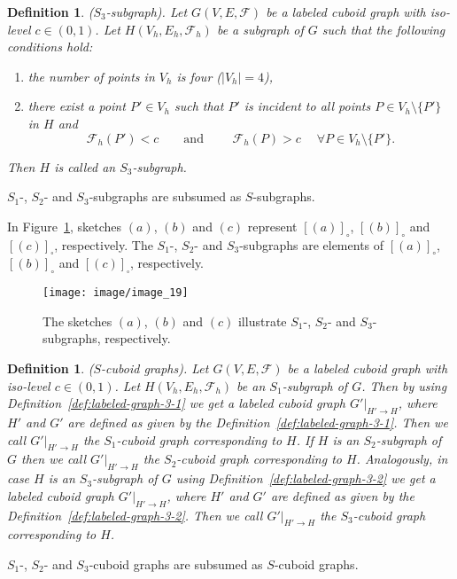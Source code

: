 \documentclass[a4paper,11pt]{article}
\newtheorem{definition}[theorem]{Definition}
\begin{document}
\begin{definition}($S_3$-subgraph). Let $G(V,E,\mathcal{F})$ be a labeled cuboid graph
with iso-level $c\in (0,1)$. Let $H(V_h,E_h,\mathcal{F}_h)$ be a subgraph of $G$ such that the following
conditions hold:
\begin{enumerate}
\item the number of points in $V_h$ is four ($|V_h|=4$),
\item there exist a point $P'\in V_h$ such that $P'$ is incident to all points $P\in V_h\setminus\{P'\}$ in $H$ and
\[
\mathcal{F}_h(P')<c\qquad\mbox{and } \qquad \mathcal{F}_h(P)> c \quad\;\forall P\in V_h\setminus\{P'\}.
\]
\end{enumerate}
Then $H$ is called an $S_3$-subgraph.
\label{def:iso-path-12}
\end{definition}
\noindent $S_1$-, $S_2$- and $S_3$-subgraphs are subsumed as $S$-subgraphs.

In Figure~\ref{image_19_hier}, sketches $(a)$, $(b)$ and $(c)$ represent $[(a)]_{\circ}$,
$[(b)]_{\circ}$ and $[(c)]_{\square}$, respectively. The $S_1$-, $S_2$- and $S_3$-subgraphs
are elements of $[(a)]_{\circ}$, $[(b)]_{\circ}$ and $[(c)]_{\square}$, respectively.
\begin{figure}[!ht]
\texttt{[image: image/image\_19]}
\caption{The sketches $(a)$, $(b)$ and $(c)$ illustrate $S_1$-, $S_2$- and  $S_3$-subgraphs,
respectively.}
\label{image_19_hier}
\end{figure}
\FloatBarrier
\begin{definition}($S$-cuboid graphs). Let $G(V,E,\mathcal{F})$ be a labeled cuboid graph
with iso-level $c\in (0,1)$. Let $H(V_h,E_h,\mathcal{F}_h)$ be an $S_1$-subgraph of $G$. Then by
using Definition~\ref{def:labeled-graph-3-1} we get a labeled cuboid graph $G'|_{H'\rightarrow H}$,
where $H'$ and $G'$ are defined as given by the Definition~\ref{def:labeled-graph-3-1}. Then
we call $G'|_{H'\rightarrow H}$ the $S_1$-cuboid graph corresponding to $H$. If $H$ is an
$S_2$-subgraph of $G$ then we call $G'|_{H'\rightarrow H}$ the $S_2$-cuboid graph corresponding to $H$.
Analogously, in case $H$ is an $S_3$-subgraph of $G$ using Definition~\ref{def:labeled-graph-3-2}
we get a labeled cuboid graph $G'|_{H'\rightarrow H}$, where $H'$ and $G'$ are defined as given
by the Definition~\ref{def:labeled-graph-3-2}. Then we call $G'|_{H'\rightarrow H}$ the $S_3$-cuboid graph
corresponding to $H$.
\label{def:iso-path-10-11-12}
\end{definition}
\noindent $S_1$-, $S_2$- and $S_3$-cuboid graphs are subsumed as $S$-cuboid graphs.
\end{document}
